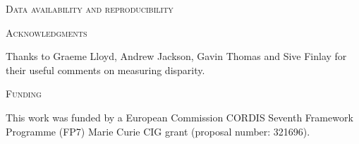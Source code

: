\documentclass[12pt,letterpaper]{article}
\renewcommand{\section}[1]{%
\bigskip
\begin{center}
\begin{Large}
\normalfont\scshape #1
\medskip
\end{Large}
\end{center}}
\begin{document}

\section{Data availability and reproducibility}

\section{Acknowledgments}
Thanks to Graeme Lloyd, Andrew Jackson, Gavin Thomas and Sive Finlay for their useful comments on measuring disparity.

\section{Funding} %
This work was funded by a European Commission CORDIS Seventh Framework Programme (FP7) Marie Curie CIG grant (proposal number: 321696).





\end{document}
